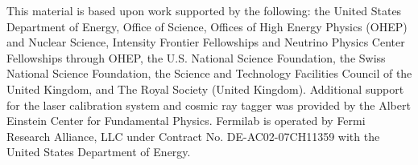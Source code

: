 \begin{acknowledgments}
This material is based upon work supported by the following: the United States Department of Energy, Office of Science, Offices of High Energy Physics (OHEP) and Nuclear Science, Intensity Frontier Fellowships and Neutrino Physics Center Fellowships through OHEP, the U.S. National Science Foundation, the Swiss National Science Foundation, the Science and Technology Facilities Council of the United Kingdom, and The Royal Society (United Kingdom). Additional support for the laser calibration system and cosmic ray tagger was provided by the Albert Einstein Center for Fundamental Physics. Fermilab is operated by Fermi Research Alliance, LLC under Contract No. DE-AC02-07CH11359 with the United States Department of Energy.
\end{acknowledgments}